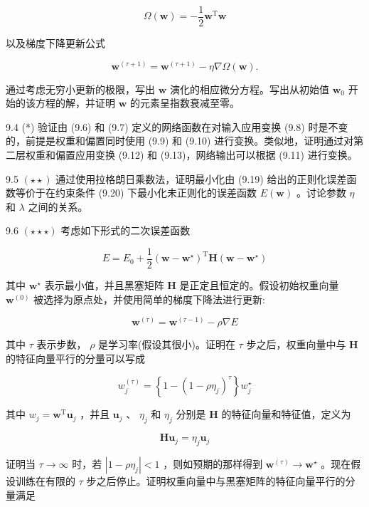 \documentclass[10pt]{article}
\begin{document}
\[
\Omega \left( \mathbf{w}\right)  =  - \frac{1}{2}{\mathbf{w}}^{\mathrm{T}}\mathbf{w} \tag{9.54}
\]

以及梯度下降更新公式

\[
{\mathbf{w}}^{\left( \tau  + 1\right) } = {\mathbf{w}}^{\left( \tau  + 1\right) } - \eta \nabla \Omega \left( \mathbf{w}\right) . \tag{9.55}
\]

通过考虑无穷小更新的极限，写出 \(\mathbf{w}\) 演化的相应微分方程。写出从初始值 \({\mathbf{w}}_{0}\) 开始的该方程的解，并证明 \(\mathbf{w}\) 的元素呈指数衰减至零。

9.4 (*) 验证由 (9.6) 和 (9.7) 定义的网络函数在对输入应用变换 (9.8) 时是不变的，前提是权重和偏置同时使用 (9.9) 和 (9.10) 进行变换。类似地，证明通过对第二层权重和偏置应用变换 (9.12) 和 (9.13)，网络输出可以根据 (9.11) 进行变换。

9.5 \(\left( {\star  \star  }\right)\) 通过使用拉格朗日乘数法，证明最小化由 (9.19) 给出的正则化误差函数等价于在约束条件 (9.20) 下最小化未正则化的误差函数 \(E\left( \mathbf{w}\right)\) 。讨论参数 \(\eta\) 和 \(\lambda\) 之间的关系。

9.6 \(\left( {\star  \star   \star  }\right)\) 考虑如下形式的二次误差函数

\[
E = {E}_{0} + \frac{1}{2}{\left( \mathbf{w} - {\mathbf{w}}^{ \star  }\right) }^{\mathrm{T}}\mathbf{H}\left( {\mathbf{w} - {\mathbf{w}}^{ \star  }}\right)  \tag{9.56}
\]

其中 \({\mathbf{w}}^{ \star  }\) 表示最小值，并且黑塞矩阵 \(\mathbf{H}\) 是正定且恒定的。假设初始权重向量 \({\mathbf{w}}^{\left( 0\right) }\) 被选择为原点处，并使用简单的梯度下降法进行更新:

\[
{\mathbf{w}}^{\left( \tau \right) } = {\mathbf{w}}^{\left( \tau  - 1\right) } - \rho \nabla E \tag{9.57}
\]

其中 \(\tau\) 表示步数， \(\rho\) 是学习率(假设其很小)。证明在 \(\tau\) 步之后，权重向量中与 \(\mathbf{H}\) 的特征向量平行的分量可以写成

\[
{w}_{j}^{\left( \tau \right) } = \left\{  {1 - {\left( 1 - \rho {\eta }_{j}\right) }^{\tau }}\right\}  {w}_{j}^{ \star  } \tag{9.58}
\]

其中 \({w}_{j} = {\mathbf{w}}^{\mathrm{T}}{\mathbf{u}}_{j}\) ，并且 \({\mathbf{u}}_{j}\) 、 \({\eta }_{j}\) 和 \({\eta }_{j}\) 分别是 \(\mathbf{H}\) 的特征向量和特征值，定义为

\[
\mathbf{H}{\mathbf{u}}_{j} = {\eta }_{j}{\mathbf{u}}_{j} \tag{9.59}
\]

证明当 \(\tau  \rightarrow  \infty\) 时，若 \(\left| {1 - \rho {\eta }_{j}}\right|  < 1\) ，则如预期的那样得到 \({\mathbf{w}}^{\left( \tau \right) } \rightarrow  {\mathbf{w}}^{ \star  }\) 。现在假设训练在有限的 \(\tau\) 步之后停止。证明权重向量中与黑塞矩阵的特征向量平行的分量满足
\end{document}
